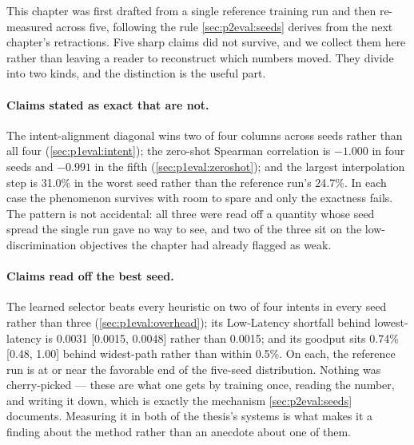 This chapter was first drafted from a single reference training run and then re-measured across five,
following the rule \cref{sec:p2eval:seeds} derives from the next chapter's retractions. Five sharp claims
did not survive, and we collect them here rather than leaving a reader to reconstruct which numbers moved.
They divide into two kinds, and the distinction is the useful part.

\paragraph{Claims stated as exact that are not.} The intent-alignment diagonal wins two of four columns
across seeds rather than all four (\cref{sec:p1eval:intent}); the zero-shot Spearman correlation is
$-1.000$ in four seeds and $-0.991$ in the fifth (\cref{sec:p1eval:zeroshot}); and the largest
interpolation step is 31.0\% in the worst seed rather than the reference run's 24.7\%. In each case the phenomenon survives
with room to spare and only the exactness fails. The pattern is not accidental: all three were read off a
quantity whose seed spread the single run gave no way to see, and two of the three sit on the
low-discrimination objectives the chapter had already flagged as weak.

\paragraph{Claims read off the best seed.} The learned selector beats every heuristic on two of four
intents in every seed rather than three (\cref{sec:p1eval:overhead}); its Low-Latency shortfall behind
lowest-latency is 0.0031 [0.0015, 0.0048] rather than 0.0015; and its goodput sits 0.74\% [0.48, 1.00]
behind widest-path rather than within 0.5\%. On each, the reference run is at or near the favorable end
of the five-seed distribution. Nothing was cherry-picked --- these are what one gets by training once,
reading the number, and writing it down, which is exactly the mechanism \cref{sec:p2eval:seeds}
documents. Measuring it in both of the thesis's systems is what makes it a finding about the method
rather than an anecdote about one of them.


